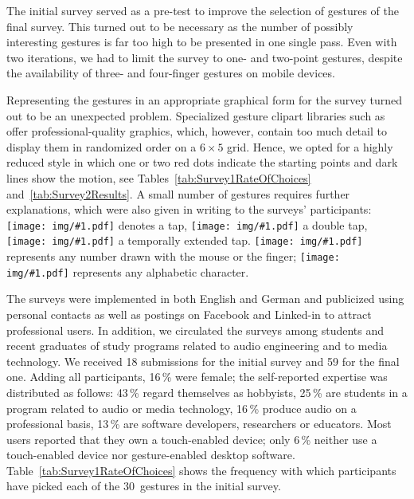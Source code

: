 \documentclass{aes130}
\newcommand{\sixthpic}[1][]{\texttt{[image: img/\#1.pdf]}}
\begin{document}
The initial survey served as a pre-test to improve the selection of gestures of the final survey. This turned out to be necessary as the number of possibly interesting gestures is far too high to be presented in one single pass. Even with two iterations, we had to limit the survey to one- and two-point gestures, despite the availability of three- and four-finger gestures on mobile devices.

Representing the gestures in an appropriate graphical form for the survey turned out to be an unexpected problem. Specialized gesture clipart libraries such as~\cite{Gestureworks,Gesturecons} offer professional-quality graphics, which, however, contain too much detail to display them in randomized order on a $6\times 5$ grid. Hence, we opted for a highly reduced style in which one or two red dots indicate the starting points and dark lines show the motion, see Tables~\ref{tab:Survey1RateOfChoices} and~\ref{tab:Survey2Results}. A small number of gestures requires further explanations, which were also given in writing to the surveys' participants: \sixthpic[tap] denotes a tap, \sixthpic[tap-double] a double tap, \sixthpic[tap-hold] a temporally extended tap. \sixthpic[digits] represents any number drawn with the mouse or the finger; \sixthpic[letters] represents any alphabetic character.

The surveys were implemented in both English and German and publicized using personal contacts as well as postings on Facebook and Linked-in to attract professional users. In addition, we circulated the surveys among students and recent graduates of study programs related to audio engineering and to media technology. We received 18 submissions for the initial survey and 59 for the final one. Adding all participants, 16\,\%{} were female; the self-reported expertise was distributed as follows: 43\,\%{} regard themselves as hobbyists, 25\,\%{} are students in a program related to audio or media technology, 16\,\%{} produce audio on a professional basis, 13\,\%{} are software developers, researchers or educators. Most users reported that they own a touch-enabled device; only 6\,\%{} neither use a touch-enabled device nor gesture-enabled desktop software. Table~\ref{tab:Survey1RateOfChoices} shows the frequency with which participants have picked each of the 30~gestures in the initial survey.
\end{document}
